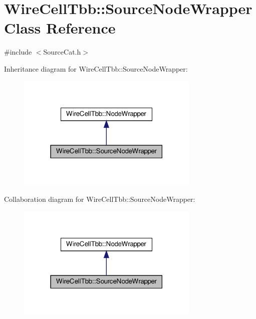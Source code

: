 \hypertarget{class_wire_cell_tbb_1_1_source_node_wrapper}{}\section{Wire\+Cell\+Tbb\+:\+:Source\+Node\+Wrapper Class Reference}
\label{class_wire_cell_tbb_1_1_source_node_wrapper}


{\ttfamily \#include $<$Source\+Cat.\+h$>$}



Inheritance diagram for Wire\+Cell\+Tbb\+:\+:Source\+Node\+Wrapper\+:
\nopagebreak
\begin{figure}[H]
\begin{center}
\leavevmode
\includegraphics[width=247pt]{class_wire_cell_tbb_1_1_source_node_wrapper__inherit__graph}
\end{center}
\end{figure}


Collaboration diagram for Wire\+Cell\+Tbb\+:\+:Source\+Node\+Wrapper\+:
\nopagebreak
\begin{figure}[H]
\begin{center}
\leavevmode
\includegraphics[width=247pt]{class_wire_cell_tbb_1_1_source_node_wrapper__coll__graph}
\end{center}
\end{figure}

